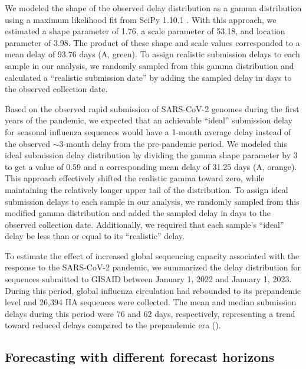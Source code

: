 \documentclass[9pt,lineno]{elife}
\begin{document}
We modeled the shape of the observed delay distribution as a gamma distribution using a maximum likelihood fit from SciPy 1.10.1 \citep{scipy}.
With this approach, we estimated a shape parameter of 1.76, a scale parameter of 53.18, and location parameter of 3.98.
The product of these shape and scale values corresponded to a mean delay of 93.76 days (A, green).
To assign realistic submission delays to each sample in our analysis, we randomly sampled from this gamma distribution and calculated a ``realistic submission date'' by adding the sampled delay in days to the observed collection date.

Based on the observed rapid submission of SARS-CoV-2 genomes during the first years of the pandemic, we expected that an achievable ``ideal'' submission delay for seasonal influenza sequences would have a 1-month average delay instead of the observed $\sim$3-month delay from the pre-pandemic period.
We modeled this ideal submission delay distribution by dividing the gamma shape parameter by 3 to get a value of 0.59 and a corresponding mean delay of 31.25 days (A, orange).
This approach effectively shifted the realistic gamma toward zero, while maintaining the relatively longer upper tail of the distribution.
To assign ideal submission delays to each sample in our analysis, we randomly sampled from this modified gamma distribution and added the sampled delay in days to the observed collection date.
Additionally, we required that each sample's ``ideal'' delay be less than or equal to its ``realistic'' delay.

To estimate the effect of increased global sequencing capacity associated with the response to the SARS-CoV-2 pandemic, we summarized the delay distribution for sequences submitted to GISAID between January 1, 2022 and January 1, 2023.
During this period, global influenza circulation had rebounded to its prepandemic level and 26,394 HA sequences were collected.
The mean and median submission delays during this period were 76 and 62 days, respectively, representing a trend toward reduced delays compared to the prepandemic era ().

\subsection{Forecasting with different forecast horizons}
\end{document}
